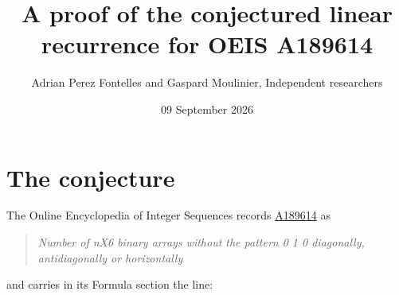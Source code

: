 \documentclass[11pt]{article}
\title{A proof of the conjectured linear recurrence for OEIS A189614}
\author{Adrian Perez Fontelles and Gaspard Moulinier, Independent researchers}
\date{09 September 2026}
\theoremstyle{definition}
\begin{document}
\maketitle
\section{The conjecture}

The Online Encyclopedia of Integer Sequences records \href{https://oeis.org/A189614}{A189614} as

\begin{quote}\itshape Number of nX6 binary arrays without the pattern 0 1 0 diagonally, antidiagonally or horizontally\end{quote}

and carries in its Formula section the line:
\end{document}
